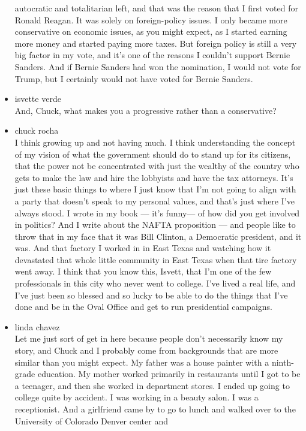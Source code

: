 \begin{itemize}
  autocratic and totalitarian left, and that was the reason that I first
  voted for Ronald Reagan. It was solely on foreign-policy issues. I
  only became more conservative on economic issues, as you might expect,
  as I started earning more money and started paying more taxes. But
  foreign policy is still a very big factor in my vote, and it's one of
  the reasons I couldn't support Bernie Sanders. And if Bernie Sanders
  had won the nomination, I would not vote for Trump, but I certainly
  would not have voted for Bernie Sanders.
\item
  isvette verde\\
  And, Chuck, what makes you a progressive rather than a conservative?
\item
  chuck rocha\\
  I think growing up and not having much. I think understanding the
  concept of my vision of what the government should do to stand up for
  its citizens, that the power not be concentrated with just the wealthy
  of the country who gets to make the law and hire the lobbyists and
  have the tax attorneys. It's just these basic things to where I just
  know that I'm not going to align with a party that doesn't speak to my
  personal values, and that's just where I've always stood. I wrote in
  my book --- it's funny--- of how did you get involved in politics? And
  I write about the NAFTA proposition --- and people like to throw that
  in my face that it was Bill Clinton, a Democratic president, and it
  was. And that factory I worked in in East Texas and watching how it
  devastated that whole little community in East Texas when that tire
  factory went away. I think that you know this, Isvett, that I'm one of
  the few professionals in this city who never went to college. I've
  lived a real life, and I've just been so blessed and so lucky to be
  able to do the things that I've done and be in the Oval Office and get
  to run presidential campaigns.
\item
  linda chavez\\
  Let me just sort of get in here because people don't necessarily know
  my story, and Chuck and I probably come from backgrounds that are more
  similar than you might expect. My father was a house painter with a
  ninth-grade education. My mother worked primarily in restaurants until
  I got to be a teenager, and then she worked in department stores. I
  ended up going to college quite by accident. I was working in a beauty
  salon. I was a receptionist. And a girlfriend came by to go to lunch
  and walked over to the University of Colorado Denver center and

\end{itemize}
